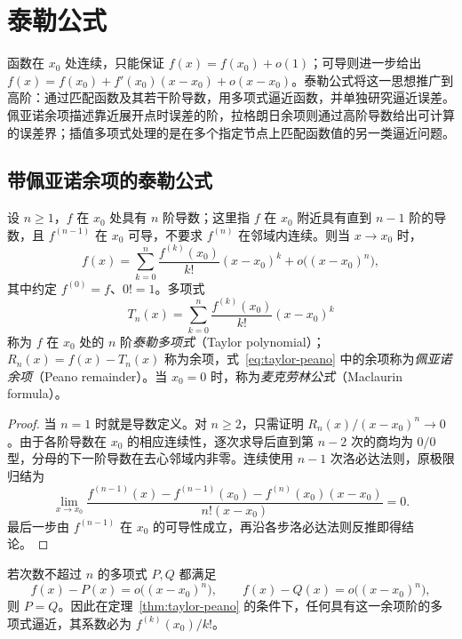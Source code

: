 \documentclass[UTF8,12pt,a4paper,fontset=fandol]{ctexbook}
\begin{document}
\section{泰勒公式}
\label{sec:taylor-formula}

函数在 $x_0$ 处连续，只能保证 $f(x)=f(x_0)+o(1)$；可导则进一步给出 $f(x)=f(x_0)+f'(x_0)(x-x_0)+o(x-x_0)$。泰勒公式将这一思想推广到高阶：通过匹配函数及其若干阶导数，用多项式逼近函数，并单独研究逼近误差。佩亚诺余项描述靠近展开点时误差的阶，拉格朗日余项则通过高阶导数给出可计算的误差界；插值多项式处理的是在多个指定节点上匹配函数值的另一类逼近问题。

\subsection{带佩亚诺余项的泰勒公式}
\label{subsec:taylor-formula-with-peano-remainder}

\begin{theorem}[带佩亚诺余项的泰勒公式]
\label{thm:taylor-peano}
设 $n\geq1$，$f$ 在 $x_0$ 处具有 $n$ 阶导数；这里指 $f$ 在 $x_0$ 附近具有直到 $n-1$ 阶的导数，且 $f^{(n-1)}$ 在 $x_0$ 可导，不要求 $f^{(n)}$ 在邻域内连续。则当 $x\to x_0$ 时，
\begin{equation}
    f(x)=\sum_{k=0}^n\frac{f^{(k)}(x_0)}{k!}(x-x_0)^k
         +o\bigl((x-x_0)^n\bigr),
    \label{eq:taylor-peano}
\end{equation}
其中约定 $f^{(0)}=f$、$0!=1$。多项式
\[
    T_n(x)=\sum_{k=0}^n\frac{f^{(k)}(x_0)}{k!}(x-x_0)^k
\]
称为 $f$ 在 $x_0$ 处的 $n$ 阶\emph{泰勒多项式}（Taylor polynomial）；$R_n(x)=f(x)-T_n(x)$ 称为余项，式~\eqref{eq:taylor-peano} 中的余项称为\emph{佩亚诺余项}（Peano remainder）。当 $x_0=0$ 时，称为\emph{麦克劳林公式}（Maclaurin formula）。
\end{theorem}

\begin{proof}
当 $n=1$ 时就是导数定义。对 $n\geq2$，只需证明 $R_n(x)/(x-x_0)^n\to0$。由于各阶导数在 $x_0$ 的相应连续性，逐次求导后直到第 $n-2$ 次的商均为 $0/0$ 型，分母的下一阶导数在去心邻域内非零。连续使用 $n-1$ 次洛必达法则，原极限归结为
\[
    \lim_{x\to x_0}
    \frac{f^{(n-1)}(x)-f^{(n-1)}(x_0)-f^{(n)}(x_0)(x-x_0)}
         {n!(x-x_0)}=0.
\]
最后一步由 $f^{(n-1)}$ 在 $x_0$ 的可导性成立，再沿各步洛必达法则反推即得结论。
\end{proof}

\begin{proposition}[多项式逼近的唯一性]
\label{prop:taylor-polynomial-uniqueness}
若次数不超过 $n$ 的多项式 $P,Q$ 都满足
\[
    f(x)-P(x)=o\bigl((x-x_0)^n\bigr),\qquad
    f(x)-Q(x)=o\bigl((x-x_0)^n\bigr),
\]
则 $P=Q$。因此在定理~\ref{thm:taylor-peano} 的条件下，任何具有这一余项阶的多项式逼近，其系数必为 $f^{(k)}(x_0)/k!$。
\end{proposition}
\end{document}
